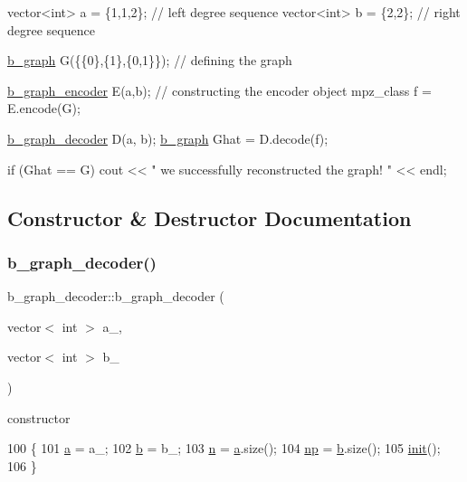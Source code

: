 \begin{DoxyCode}
vector<int> a = \{1,1,2\}; \textcolor{comment}{// left degree sequence }
vector<int> b = \{2,2\}; \textcolor{comment}{// right degree sequence}

\hyperlink{classb__graph}{b\_graph} G(\{\{0\},\{1\},\{0,1\}\}); \textcolor{comment}{// defining the graph}

\hyperlink{classb__graph__encoder}{b\_graph\_encoder} E(a,b); \textcolor{comment}{// constructing the encoder object}
mpz\_class f = E.encode(G);

\hyperlink{classb__graph__decoder}{b\_graph\_decoder} D(a, b);
\hyperlink{classb__graph}{b\_graph} Ghat = D.decode(f);

\textcolor{keywordflow}{if} (Ghat == G)
   cout << \textcolor{stringliteral}{" we successfully reconstructed the graph! "} << endl;
\end{DoxyCode}
 

\subsection{Constructor \& Destructor Documentation}
\mbox{\label{classb__graph__decoder_a2284e65bb4fcdd9356fc6a3109c2a4a7}} 
\subsubsection{\texorpdfstring{b\+\_\+graph\+\_\+decoder()}{b\_graph\_decoder()}}
{\footnotesize\ttfamily b\+\_\+graph\+\_\+decoder\+::b\+\_\+graph\+\_\+decoder (\begin{DoxyParamCaption}\item[{vector$<$ int $>$}]{a\+\_\+,  }\item[{vector$<$ int $>$}]{b\+\_\+ }\end{DoxyParamCaption})}



constructor 


\begin{DoxyCode}
100 \{
101   \hyperlink{classb__graph__decoder_afcf783e4199fb8f9d6828db08bb12333}{a} = a\_;
102   \hyperlink{classb__graph__decoder_a12d1a4a91f342111d2116196cb826317}{b} = b\_;
103   \hyperlink{classb__graph__decoder_a2caddd63df6808c95e2ee738f7c77870}{n} = \hyperlink{classb__graph__decoder_afcf783e4199fb8f9d6828db08bb12333}{a}.size();
104   \hyperlink{classb__graph__decoder_a7eca48cf8793e722d1b29dbdc9fd2dca}{np} = \hyperlink{classb__graph__decoder_a12d1a4a91f342111d2116196cb826317}{b}.size();
105   \hyperlink{classb__graph__decoder_a9498e8aa7391480cc663bffef3718c6b}{init}();
106 \}
\end{DoxyCode}


